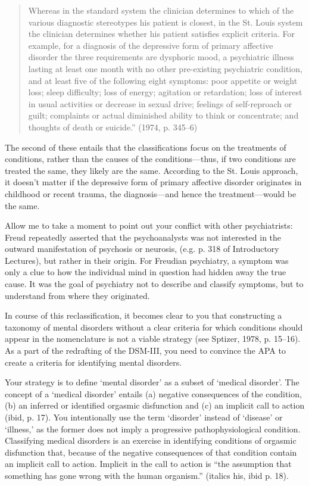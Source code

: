\begin{refsection}
\begin{quote}

Whereas in the standard system the clinician determines to which of the various diagnostic stereotypes his patient is closest, in the St. Louis system the clinician determines whether his patient satisfies explicit criteria. For example, for a diagnosis of the depressive form of primary affective disorder the three requirements are dysphoric mood, a psychiatric illness lasting at least one month with no other pre-existing psychiatric condition, and at least five of the following eight symptoms: poor appetite or weight loss; sleep difficulty; loss of energy; agitation or retardation; loss of interest in usual activities or decrease in sexual drive; feelings of self-reproach or guilt; complaints or actual diminished ability to think or concentrate; and thoughts of death or suicide.” (1974, p. 345--6)
\end{quote}

The second of these entails that the classifications focus on the treatments of conditions, rather than the causes of the conditions—thus, if two conditions are treated the same, they likely are the same. According to the St. Louis approach, it doesn't matter if the depressive form of primary affective disorder originates in childhood or recent trauma, the diagnosis—and hence the treatment—would be the same.

Allow me to take a moment to point out your conflict with other psychiatrists: Freud repeatedly asserted that the psychoanalysts was not interested in the outward manifestation of psychosis or neurosis, (e.g. p. 318 of Introductory Lectures), but rather in their origin. For Freudian psychiatry, a symptom was only a clue to how the individual mind in question had hidden away the true cause. It was the goal of psychiatry not to describe and classify symptoms, but to understand from where they originated.

In course of this reclassification, it becomes clear to you that constructing a taxonomy of mental disorders without a clear criteria for which conditions should appear in the nomenclature is not a viable strategy (see Sptizer, 1978, p. 15--16). As a part of the redrafting of the DSM-III, you need to convince the APA to create a criteria for identifying mental disorders. 

Your strategy is to define `mental disorder' as a subset of `medical disorder'. The concept of a `medical disorder' entails (a) negative consequences of the condition, (b) an inferred or identified orgasmic disfunction and (c) an implicit call to action (ibid, p. 17). You intentionally use the term `disorder' instead of `disease' or `illness,' as the former does not imply a progressive pathophysiological condition. Classifying medical disorders is an exercise in identifying conditions of orgasmic disfunction that, because of the negative consequences of that condition contain an implicit call to action. Implicit in the call to action is “the assumption that something has gone wrong with the human organism.” (italics his, ibid p. 18).


\end{refsection}
